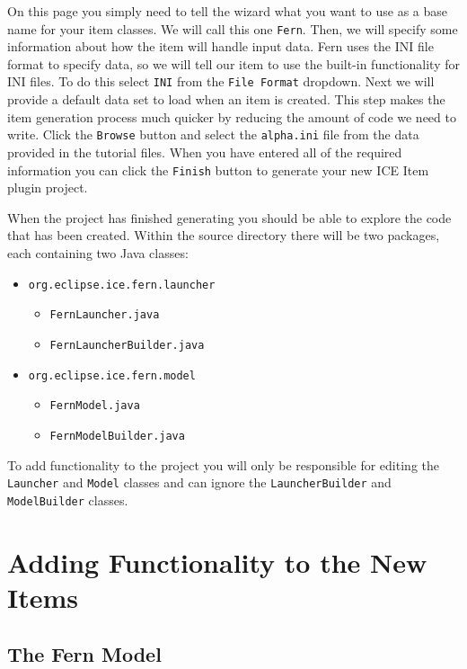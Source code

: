 On this page you simply need to tell the wizard what you want to use as a base
name for your item classes.  We will call this one \texttt{Fern}. Then, we will
specify some information about how the item will handle input data.  Fern uses
the INI file format to specify data, so we will tell our item to use the built-in
functionality for INI files.  To do this  select \texttt{INI} from the \texttt{File Format} dropdown.  
Next we will provide a default data set to load when an item is created.  This step 
makes the item generation process much quicker by reducing the amount of code we need to write.
Click the \texttt{Browse} button and select the \texttt{alpha.ini} file from the data provided
in the tutorial files. 
When you have entered all of the required information you can
click the \texttt{Finish} button to generate your new ICE Item plugin project.

When the project has finished generating you should be able to explore the code
that has been created.  Within the source directory there will be two packages,
each containing two Java classes:

\begin{itemize} 
    \item \texttt{org.eclipse.ice.fern.launcher} 
    \begin{itemize}
        \item \texttt{FernLauncher.java} 
        \item \texttt{FernLauncherBuilder.java}
    \end{itemize} 
    \item \texttt{org.eclipse.ice.fern.model} 
    \begin{itemize} 
        \item \texttt{FernModel.java} 
        \item \texttt{FernModelBuilder.java}
    \end{itemize} 
\end{itemize}

To add functionality to the project you will only be responsible for editing
the \texttt{Launcher} and \texttt{Model} classes and can ignore the
\texttt{LauncherBuilder} and \texttt{ModelBuilder} classes.


\section*{Adding Functionality to the New Items}

\subsection*{The Fern Model}

